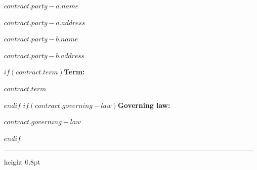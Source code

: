 {{{{{{{{{{{{\begin{minipage}[t]{0.45\textwidth}
                          {\small\bfseries $contract.party-a.name$\par}%
                          {\small $contract.party-a.address$\par}%
                        \end{minipage}\hfill
                        \begin{minipage}[t]{0.45\textwidth}
                          \raggedright
                          {\small\bfseries $contract.party-b.name$\par}%
                          {\small $contract.party-b.address$\par}%
                        \end{minipage}\par
                        \vspace{0.8em}
                        $if(contract.term)${\small\bfseries Term:} {\small $contract.term$\par}$endif$
                        $if(contract.governing-law)${\small\bfseries Governing law:} {\small $contract.governing-law$\par}$endif$
                        \vspace{0.5em}
                        {\color{obsidian}\hrule height 0.8pt}\par
                        \vspace{0.8em}
                      }{%
                        }}}}}}}}}}}}
